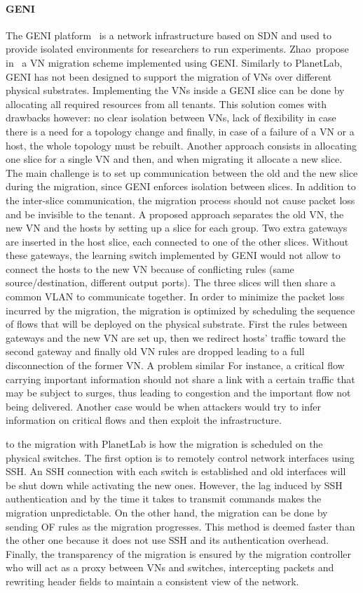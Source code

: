 \paragraph{GENI} The GENI platform~\cite{GENI-Berman2014} is a network infrastructure based on SDN and used to provide isolated environments for researchers to run experiments.
Zhao~\etal propose in~\cite{Zhao2017} a VN migration scheme implemented using GENI. Similarly to PlanetLab, GENI has not been designed to support the migration of VNs over different physical substrates. Implementing the VNs inside a GENI slice can be done by allocating all required resources from all tenants. This solution comes with drawbacks however: no clear isolation between VNs, lack of flexibility in case there is a need for a topology change and finally, in case of a failure of a VN or a host, the whole topology must be rebuilt.
Another approach consists in allocating one slice for a single VN and then, and when migrating it allocate a new slice. The main challenge is to set up communication between the old and the new slice during the migration, since GENI enforces isolation between slices.
In addition to the inter-slice communication, the migration process should not cause packet loss and be invisible to the tenant.
A proposed approach separates the old VN, the new VN and the hosts by setting up a slice for each group. Two extra gateways are inserted in the host slice, each connected to one of the other slices.
Without these gateways, the learning switch implemented by GENI would not allow to connect the hosts to the new VN because of conflicting rules (same source/destination, different output ports).
The three slices will then share a common VLAN to communicate together.
In order to minimize the packet loss incurred by the migration, the migration is optimized by scheduling the sequence of flows that will be deployed on the physical substrate.
First the rules between gateways and the new VN are set up, then we redirect hosts' traffic toward the second gateway and finally old VN rules are dropped leading to a full disconnection of the former VN.
A problem similar For instance, a critical flow carrying important information should not share a link with a certain traffic that may be subject to surges, thus leading to congestion and the important flow not being delivered. Another case would be when attackers would try to infer information on critical flows and then exploit the infrastructure.

to the migration with PlanetLab is how the migration is scheduled on the physical switches.
The first option is to remotely control network interfaces using SSH.
An SSH connection with each switch is established and old interfaces will be shut down while activating the new ones.
However, the lag induced by SSH authentication and by the time it takes to transmit commands makes the migration unpredictable.
On the other hand, the migration can be done by sending OF rules as the migration progresses. This method is deemed faster than the other one because it does not use SSH and its authentication overhead.
Finally, the transparency of the migration is ensured by the migration controller who will act as a proxy between VNs and switches, intercepting packets and rewriting header fields to maintain a consistent view of the network.

